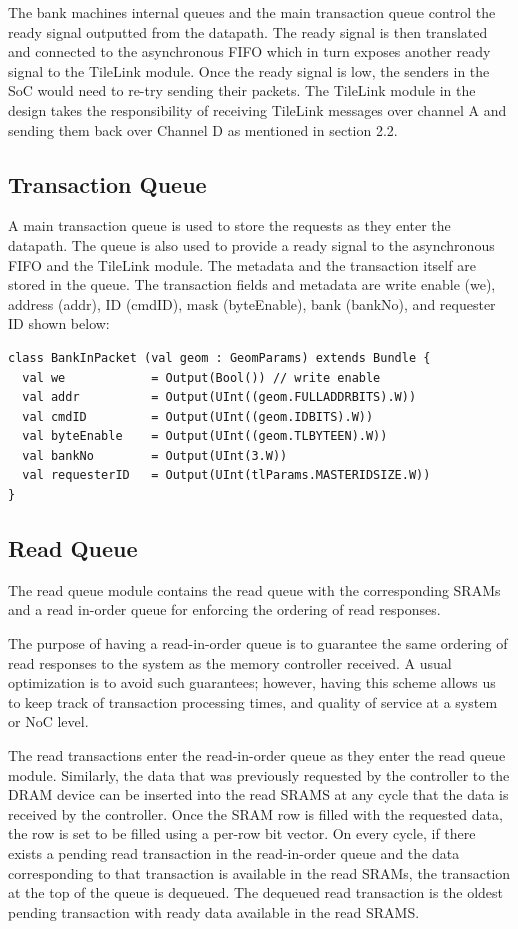 The bank machines internal queues and the main transaction queue control the ready signal outputted from the datapath. The ready signal is then translated and connected to the asynchronous FIFO which in turn exposes another ready signal to the TileLink module. Once the ready signal is low, the senders in the SoC would need to re-try sending their packets. The TileLink module in the design takes the responsibility of receiving TileLink messages over channel A and sending them back over Channel D as mentioned in section 2.2.
\subsection{Transaction Queue}
A main transaction queue is used to store the requests as they enter the datapath. The queue is also used to provide a ready signal to the asynchronous FIFO and the TileLink module. The metadata and the transaction itself are stored in the queue. The transaction fields and metadata are write enable (we), address (addr), ID (cmdID), mask (byteEnable), bank (bankNo), and requester ID shown below:
\begin{verbatim}
class BankInPacket (val geom : GeomParams) extends Bundle {
  val we            = Output(Bool()) // write enable
  val addr          = Output(UInt((geom.FULLADDRBITS).W))
  val cmdID         = Output(UInt((geom.IDBITS).W))
  val byteEnable    = Output(UInt((geom.TLBYTEEN).W))
  val bankNo        = Output(UInt(3.W))
  val requesterID   = Output(UInt(tlParams.MASTERIDSIZE.W))
}
\end{verbatim}
\subsection{Read Queue}
The read queue module contains the read queue with the corresponding SRAMs and a read in-order queue for enforcing the ordering of read responses. 

The purpose of having a read-in-order queue is to guarantee the same ordering of read responses to the system as the memory controller received. A usual optimization is to avoid such guarantees; however, having this scheme allows us to keep track of transaction processing times, and quality of service at a system or NoC level. 

The read transactions enter the read-in-order queue as they enter the read queue module. Similarly, the data that was previously requested by the controller to the DRAM device can be inserted into the read SRAMS at any cycle that the data is received by the controller. Once the SRAM row is filled with the requested data, the row is set to be filled using a per-row bit vector. On every cycle, if there exists a pending read transaction in the read-in-order queue and the data corresponding to that transaction is available in the read SRAMs, the transaction at the top of the queue is dequeued. The dequeued read transaction is the oldest pending transaction with ready data available in the read SRAMS.

